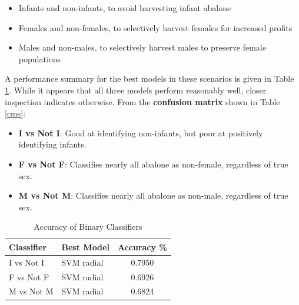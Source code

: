 \documentclass[11pt, a4paper]{article}
\begin{document}
    \begin{itemize}
        \item Infants and non-infants, to avoid harvesting infant abalone
        \item Females and non-females, to selectively harvest females for increased profits \parencite{atlantic}
        \item Males and non-males, to selectively harvest males to preserve female populations
    \end{itemize}

    A performance summary for the best models in these scenarios is given in Table \ref{binary}. While it appears that all three models perform reasonably well, closer inspection indicates otherwise. From the \textbf{confusion matrix} shown in Table \ref{cms}:

    \begin{itemize}
        \item \textbf{I vs Not I}: Good at identifying non-infants, but poor at positively identifying infants.
        \item \textbf{F vs Not F}: Classifies nearly all abalone as non-female, regardless of true sex.
        \item \textbf{M vs Not M}: Classifies nearly all abalone as non-male, regardless of true sex.
    \end{itemize} 
 
    \begin{table}[ht]
        \centering
        \begin{tabular}{|l|l|c|}
            \hline
            Classifier  & Best Model    & Accuracy \% \\
            \hline
            I vs Not I  & SVM radial    & 0.7950 \\
            F vs Not F  & SVM radial    & 0.6926 \\
            M vs Not M  & SVM radial    & 0.6824 \\
            \hline
        \end{tabular}
        \caption{Accuracy of Binary Classifiers}
        \label{binary}
    \end{table}
\end{document}
